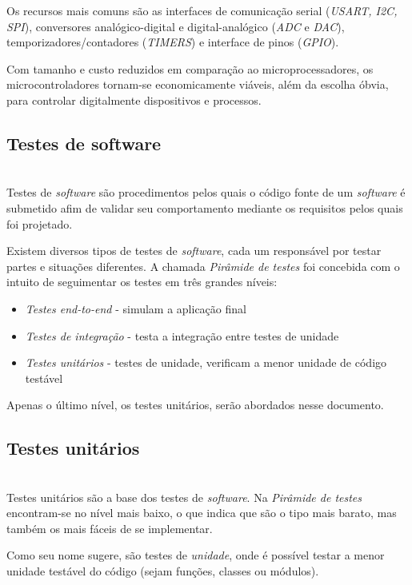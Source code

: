 \documentclass[times, twoside, watermark]{artigo}
\begin{document}
Os recursos mais comuns são as interfaces de comunicação 
serial (\textit{USART, I2C, SPI}), conversores analógico-digital e digital-analógico 
(\textit{ADC} e \textit{DAC}), temporizadores/contadores (\textit{TIMERS}) e 
interface de pinos (\textit{GPIO}).

Com tamanho e custo reduzidos em comparação ao microprocessadores,
os microcontroladores tornam-se economicamente viáveis, além da
escolha óbvia, para controlar digitalmente dispositivos e processos\cite{gridling2007introduction}.

\subsection{Testes de software}\hfill\\

Testes de \textit{software} são procedimentos pelos quais o código fonte de um
\textit{software} é submetido afim de validar seu comportamento mediante
os requisitos pelos quais foi projetado.

Existem diversos tipos de testes de \textit{software}, cada um responsável por 
testar partes e situações diferentes. A chamada \textit{Pirâmide de testes}
\cite{contan2018test} foi concebida com o intuito de seguimentar os testes em três 
grandes níveis:

\begin{itemize}
\item \textit{Testes end-to-end} - simulam a aplicação final
\item \textit{Testes de integração} - testa a integração entre testes de unidade
\item \textit{Testes unitários} - testes de unidade, verificam a menor unidade de código testável
\end{itemize}

Apenas o último nível, os testes unitários, serão abordados nesse documento.

\subsection{Testes unitários}\hfill\\

Testes unitários são a base dos testes de \textit{software}. Na \textit{Pirâmide de 
testes} encontram-se no nível mais baixo, o que indica que são 
o tipo mais barato, mas também os mais fáceis de se 
implementar\cite{contan2018test}.

Como seu nome sugere, são testes de \textit{unidade}, onde é possível testar a 
menor unidade testável do código (sejam funções, classes ou módulos).
\end{document}

